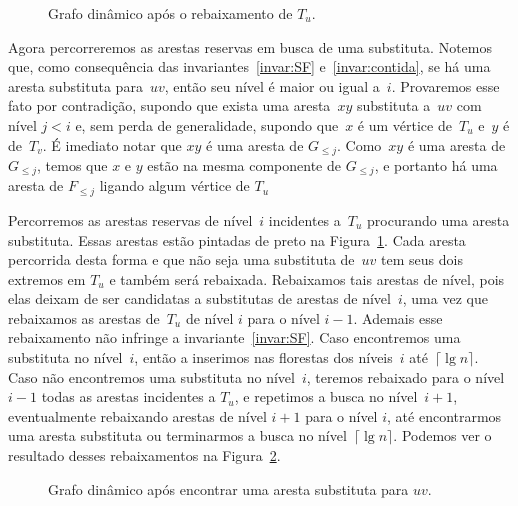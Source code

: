\begin{figure}[htb]
\centering
\caption{Grafo dinâmico após o rebaixamento de $T_u$.}
\label{fig:DG-depois-de-rebaixar}
\end{figure}

Agora percorreremos as arestas reservas em busca de uma substituta. Notemos que, como consequência das invariantes~\ref{invar:SF} e~\ref{invar:contida}, se há uma aresta substituta para~$uv$, então seu nível é maior ou igual a~$i$. Provaremos esse fato por contradição, supondo que exista uma aresta~$xy$ substituta a~$uv$ com nível $j<i$ e, sem perda de generalidade, supondo que~$x$ é um vértice de~$T_u$ e~$y$ é de~$T_v$. É imediato notar que $xy$ é uma aresta de $G_{\leqslant j}$. Como~$xy$ é uma aresta de $G_{\leqslant j}$, temos que $x$ e $y$ estão na mesma componente de $G_{\leqslant j}$, e portanto há uma aresta de $F_{\leqslant j}$ ligando algum vértice de $T_u$ 

Percorremos as arestas reservas de nível~$i$ incidentes a~$T_u$ procurando uma aresta substituta. Essas arestas estão pintadas de preto na Figura~\ref{fig:DG-depois-de-rebaixar}. Cada aresta percorrida desta forma e que não seja uma substituta de~$uv$ tem seus dois extremos em $T_u$ e também será rebaixada.
Rebaixamos tais arestas de nível, pois elas deixam de ser candidatas a substitutas de arestas de nível~$i$, uma vez que rebaixamos as arestas de~$T_u$ de nível $i$ para o nível $i-1$. 
Ademais esse rebaixamento não infringe a invariante~\ref{invar:SF}.
Caso encontremos uma substituta no nível~$i$, então a inserimos nas florestas dos níveis~$i$ até~$\lceil \lg n \rceil$. Caso não encontremos uma substituta no nível~$i$, teremos rebaixado para o nível $i-1$ todas as arestas incidentes a $T_u$, e repetimos a busca no nível~$i+1$, eventualmente rebaixando arestas de nível $i+1$ para o nível $i$, até encontrarmos uma aresta substituta ou terminarmos a busca no nível~$\lceil \lg n \rceil$. Podemos ver o resultado desses rebaixamentos na Figura~\ref{fig:DG-depois-achou-sub}.
\begin{figure}[htb]
\centering
\caption{Grafo dinâmico após encontrar uma aresta substituta para $uv$.}
\label{fig:DG-depois-achou-sub}
\end{figure}

